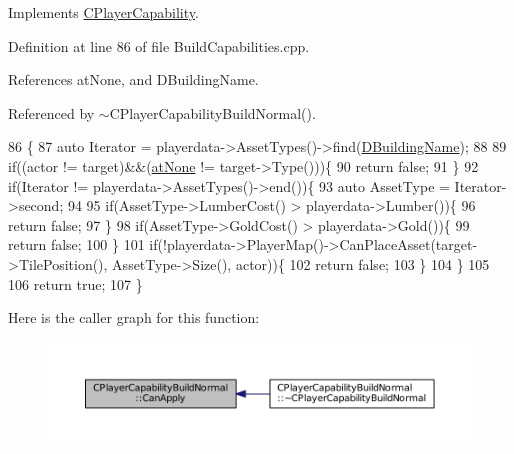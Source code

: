 Implements \hyperlink{classCPlayerCapability_ae96263e0950f496492f8baeb877b9554}{C\+Player\+Capability}.



Definition at line 86 of file Build\+Capabilities.\+cpp.



References at\+None, and D\+Building\+Name.



Referenced by $\sim$\+C\+Player\+Capability\+Build\+Normal().


\begin{DoxyCode}
86                                                                                                            
                                                        \{
87     \textcolor{keyword}{auto} Iterator = playerdata->AssetTypes()->find(\hyperlink{classCPlayerCapabilityBuildNormal_aae09d6cee5f8e201a0139c9065a5577c}{DBuildingName});
88     
89     \textcolor{keywordflow}{if}((actor != target)&&(\hyperlink{GameDataTypes_8h_a5600d4fc433b83300308921974477feca82fb51718e2c00981a2d37bc6fe92593}{atNone} != target->Type()))\{
90         \textcolor{keywordflow}{return} \textcolor{keyword}{false};
91     \}
92     \textcolor{keywordflow}{if}(Iterator != playerdata->AssetTypes()->end())\{
93         \textcolor{keyword}{auto} AssetType = Iterator->second;
94 
95         \textcolor{keywordflow}{if}(AssetType->LumberCost() > playerdata->Lumber())\{
96             \textcolor{keywordflow}{return} \textcolor{keyword}{false};   
97         \}
98         \textcolor{keywordflow}{if}(AssetType->GoldCost() > playerdata->Gold())\{
99             \textcolor{keywordflow}{return} \textcolor{keyword}{false};   
100         \}
101         \textcolor{keywordflow}{if}(!playerdata->PlayerMap()->CanPlaceAsset(target->TilePosition(), AssetType->Size(), actor))\{
102             \textcolor{keywordflow}{return} \textcolor{keyword}{false};
103         \}
104     \}
105 
106     \textcolor{keywordflow}{return} \textcolor{keyword}{true};
107 \}
\end{DoxyCode}
Here is the caller graph for this function\+:\nopagebreak
\begin{figure}[H]
\begin{center}
\leavevmode
\includegraphics[width=350pt]{classCPlayerCapabilityBuildNormal_a1a8c6fdd9d8a91ecb7417163279e2276_icgraph}
\end{center}
\end{figure}
\hypertarget{classCPlayerCapabilityBuildNormal_a5487e5521779846198604e8ebadaf283}{}\label{classCPlayerCapabilityBuildNormal_a5487e5521779846198604e8ebadaf283} 
